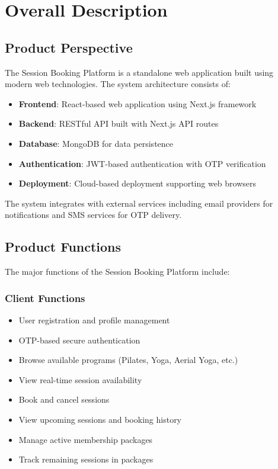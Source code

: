 \documentclass[12pt,a4paper]{article}
\begin{document}
\section{Overall Description}

\subsection{Product Perspective}
The Session Booking Platform is a standalone web application built using modern web technologies. The system architecture consists of:

\begin{itemize}
    \item \textbf{Frontend}: React-based web application using Next.js framework
    \item \textbf{Backend}: RESTful API built with Next.js API routes
    \item \textbf{Database}: MongoDB for data persistence
    \item \textbf{Authentication}: JWT-based authentication with OTP verification
    \item \textbf{Deployment}: Cloud-based deployment supporting web browsers
\end{itemize}

The system integrates with external services including email providers for notifications and SMS services for OTP delivery.

\subsection{Product Functions}
The major functions of the Session Booking Platform include:

\subsubsection{Client Functions}
\begin{itemize}
    \item User registration and profile management
    \item OTP-based secure authentication
    \item Browse available programs (Pilates, Yoga, Aerial Yoga, etc.)
    \item View real-time session availability
    \item Book and cancel sessions
    \item View upcoming sessions and booking history
    \item Manage active membership packages
    \item Track remaining sessions in packages
\end{itemize}
\end{document}
